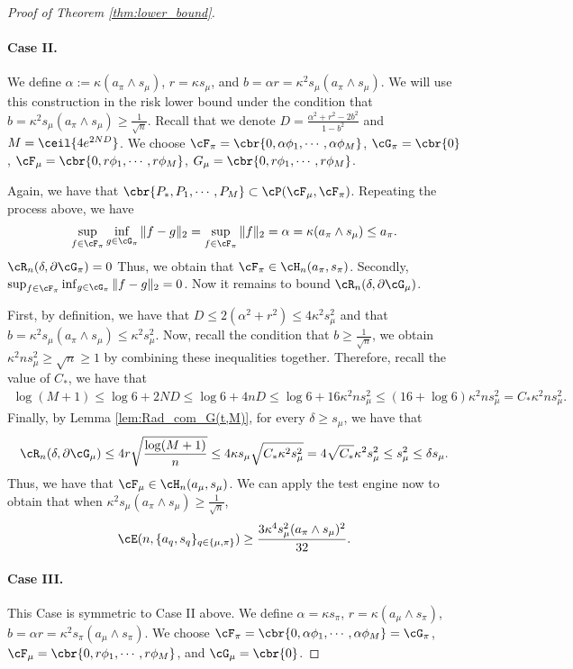\documentclass[11pt]{article}
\begin{document}
\begin{proof}[Proof of Theorem \ref{thm:lower_bound}]
\paragraph{Case II.} We define $\alpha:=\kappa (a_\pi\wedge s_\mu)$, $r=\kappa s_\mu$, and $b=\alpha r=\kappa^2s_\mu(a_\pi\wedge s_\mu)$. We will use this construction in the risk lower bound under the condition that $b=\kappa^2s_\mu(a_\pi\wedge s_\mu)\ge \frac{1}{\sqrt{n}}$. Recall that we denote $D=\frac{\alpha^2+r^2-2b^2}{1-b^2}$ and $M=\ceil{4e^{2ND}}$.
We choose $\cF_{\pi}=\cbr{0,\alpha\phi_1,\cdots,\alpha\phi_M}$, $\cG_{\pi}=\cbr{0}$, $\cF_{\mu}=\cbr{0,r\phi_1,\cdots,r\phi_M}$, $G_{\mu}=\cbr{0,r\phi_1,\cdots,r\phi_M}$.

Again, we have that $\cbr{P_*,P_1,\cdots,P_M}\subset \cP(\cF_{\mu},\cF_\pi)$. Repeating the process above, we have
\begin{align*}
    \sup_{f\in\cF_{\pi}}\inf_{g\in\cG_\pi}\|f-g\|_2=\sup_{f\in\cF_\pi}\|f\|_2=\alpha=\kappa(a_\pi\wedge s_\mu)\le a_\pi. 
\end{align*}
$\cR_n(\delta,\partial \cG_\pi)=0$ Thus, we obtain that $\cF_\pi\in\cH_n(a_\pi,s_\pi)$. Secondly, $\sup_{f\in\cF_{\pi}}\inf_{g\in\cG_\pi}\|f-g\|_2=0$. Now it remains to bound $\cR_n(\delta,\partial\cG_\mu)$.

First, by definition, we have that $D\le2(\alpha^2+r^2)\le 4\kappa^2s_\mu^2$ and that $b=\kappa^2s_\mu(a_\pi\wedge s_\mu)\le \kappa^2s_\mu^2$. Now, recall the condition that $b\ge\frac{1}{\sqrt{n}}$, we obtain $\kappa^2ns_\mu^2\ge\sqrt{n}\ge 1$ by combining these inequalities together. Therefore, recall the value of $C_*$, we have that
\begin{align*}
    \log(M+1)\le \log 6+2ND\le \log 6+4nD\le \log 6+16\kappa^2ns_{\mu}^2\le (16+\log 6)\kappa^2ns_\mu^2=C_*\kappa^2ns_\mu^2.
\end{align*}
Finally, by Lemma \ref{lem:Rad_com_G(t,M)}, for every $\delta\ge s_\mu$, we have that
\begin{align*}
    \cR_n(\delta,\partial\cG_\mu)\le 4r\sqrt{\frac{\log (M+1)}{n}}\le 4\kappa s_\mu\sqrt{C_*\kappa^2s_\mu^2}=4\sqrt{C_*}\kappa^2s_\mu^2\le s_\mu^2\le \delta s_\mu.
\end{align*}
Thus, we have that $\cF_\mu\in \cH_n(a_\mu,s_\mu)$. We can apply the test engine now to obtain that when $\kappa^2s_\mu(a_\pi\wedge s_\mu)\ge\frac{1}{\sqrt{n}}$,
\[
\cE(n,\{a_q,s_q\}_{q\in\{\mu,\pi\}})\ge \frac{3\kappa^4s_\mu^2(a_\pi\wedge s_\mu)^2}{32}.
\]
\paragraph{Case III.} This Case is symmetric to Case II above.  We define $\alpha=\kappa s_\pi$, $r=\kappa(a_\mu\wedge s_\pi)$, $b=\alpha r=\kappa^2s_\pi(a_\mu\wedge s_\pi)$. We choose $\cF_\pi=\cbr{0,\alpha\phi_1,\cdots,\alpha\phi_M}=\cG_\pi$, $\cF_{\mu}=\cbr{0,r\phi_1,\cdots,r\phi_M}$, and $\cG_\mu=\cbr{0}$.


\end{proof}
\end{document}
